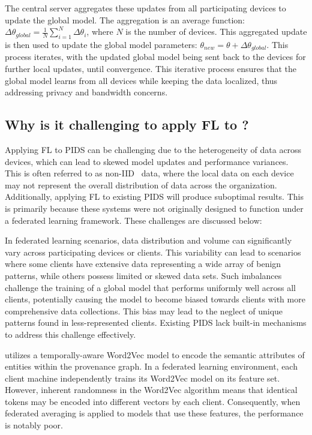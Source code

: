 The central server aggregates these updates from all participating devices to update the global model. The aggregation is an average function: \(\Delta \theta_{global} = \frac{1}{N} \sum_{i=1}^{N} \Delta \theta_i\), where \(N\) is the number of devices. This aggregated update is then used to update the global model parameters: \(\theta_{new} = \theta + \Delta \theta_{global}\). This process iterates, with the updated global model being sent back to the devices for further local updates, until convergence. This iterative process ensures that the global model learns from all devices while keeping the data localized, thus addressing privacy and bandwidth concerns.


\subsection{Why is it challenging to apply FL to \pids?}

Applying FL to PIDS can be challenging due to the heterogeneity of data across devices, which can lead to skewed model updates and performance variances. This is often referred to as non-IID~\cite{zhao2018federated} data, where the local data on each device may not represent the overall distribution of data across the organization. Additionally, applying FL to existing PIDS will produce suboptimal results. This is primarily because these systems were not originally designed to function under a federated learning framework. These challenges are discussed below:

 In federated learning scenarios, data distribution and volume can significantly vary across participating devices or clients. This variability can lead to scenarios where some clients have extensive data representing a wide array of benign patterns, while others possess limited or skewed data sets. Such imbalances challenge the training of a global model that performs uniformly well across all clients, potentially causing the model to become biased towards clients with more comprehensive data collections. This bias may lead to the neglect of unique patterns found in less-represented clients. Existing PIDS lack built-in mechanisms to address this challenge effectively.

 \flash utilizes a temporally-aware Word2Vec model to encode the semantic attributes of entities within the provenance graph. In a federated learning environment, each client machine independently trains its Word2Vec model on its feature set. However, inherent randomness in the Word2Vec algorithm means that identical tokens may be encoded into different vectors by each client. Consequently, when federated averaging is applied to \gnn models that use these features, the performance is notably poor.

